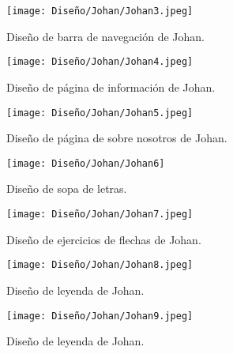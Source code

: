 \begin{figure}[ht!]
  \centering
  \texttt{[image: Diseño/Johan/Johan3.jpeg]}
  \caption{Diseño de barra de navegación de Johan.}
  \label{Johan3}
\end{figure}

\begin{figure}[ht!]
  \centering
  \texttt{[image: Diseño/Johan/Johan4.jpeg]}
  \caption{Diseño de página de información de Johan.}
  \label{Johan4}
\end{figure}

\begin{figure}[ht!]
  \centering
  \texttt{[image: Diseño/Johan/Johan5.jpeg]}
  \caption{Diseño de página de sobre nosotros de Johan.}
  \label{Johan5}
\end{figure}

\begin{figure}[ht!]
  \centering
  \texttt{[image: Diseño/Johan/Johan6]}
  \caption{Diseño de sopa de letras.}
  \label{Johan6}
\end{figure}

\begin{figure}[ht!]
  \centering
  \texttt{[image: Diseño/Johan/Johan7.jpeg]}
  \caption{Diseño de ejercicios de flechas de Johan.}
  \label{Johan7}
\end{figure}

\begin{figure}[ht!]
  \centering
  \texttt{[image: Diseño/Johan/Johan8.jpeg]}
  \caption{Diseño de leyenda de Johan.}
  \label{Johan8}
\end{figure}

\begin{figure}[ht!]
  \centering
  \texttt{[image: Diseño/Johan/Johan9.jpeg]}
  \caption{Diseño de leyenda de Johan.}
  \label{Johan9}
\end{figure}